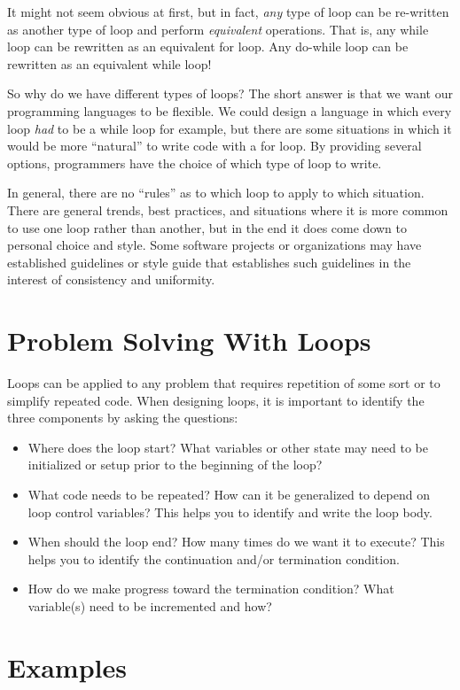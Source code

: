 It might not seem obvious at first, but in fact, \emph{any} type of loop can be re-written 
as another type of loop and perform \emph{equivalent} operations.  That is, any while loop
can be rewritten as an equivalent for loop.  Any do-while loop can be rewritten as an 
equivalent while loop!  

So why do we have different types of loops?  The short answer is that we want our programming
languages to be flexible.  We could design a language in which every loop
\emph{had} to be a while loop for example, but there are some situations in which it would be 
more ``natural'' to write code with a for loop.  By providing several options, programmers have
the choice of which type of loop to write.  

In general, there are no ``rules'' as to which loop to apply to which situation.  There are general
trends, best practices, and situations where it is more common to use one loop rather than another,
but in the end it does come down to personal choice and style.  Some software projects or
organizations may have established guidelines or style guide that establishes such guidelines in the interest of consistency and uniformity.  

\section{Problem Solving With Loops}

Loops can be applied to any problem that requires repetition of some sort 
or to simplify
repeated code.  When designing loops, it is important to identify the three components by asking
the questions:
\begin{itemize}
  \item Where does the loop start?  What variables or other state may need to be initialized or setup
  	prior to the beginning of the loop?	
  \item What code needs to be repeated?  How can it be generalized to depend on loop control variables?
  	This helps you to identify and write the loop body.
  \item When should the loop end?  How many times do we want it to execute?  This helps you to 
  	identify the continuation and/or termination condition.
  \item How do we make progress toward the termination condition?  What variable(s) need to be incremented
  	and how?
\end{itemize}

\section{Examples}

